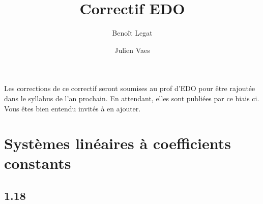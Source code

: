 \documentclass[fontsize=12pt]{article}
\title{Correctif EDO}
\author{Benoît Legat \and Julien Vaes}
\begin{document}
\maketitle

Les corrections de ce correctif seront soumises au prof d'EDO pour
être rajoutée dans le syllabus de l'an prochain.
En attendant, elles sont publiées par ce biais ci.
Vous êtes bien entendu invités à en ajouter.

\section{Systèmes linéaires à coefficients constants}

\subsection*{1.18}
\end{document}
